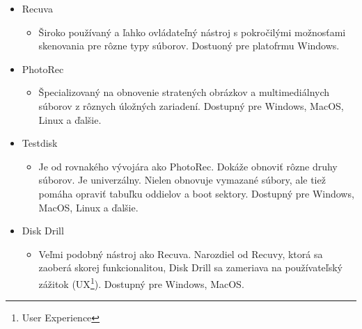\documentclass[12pt,oneside,slovak,a4paper]{article}
\begin{document}
\begin{spacing}{1.0}
\begin{itemize}
	\item Recuva
		\begin{itemize}
			\item Široko používaný a ľahko ovládateľný nástroj s pokročilými možnosťami skenovania pre rôzne typy súborov. Dostuoný pre platofrmu Windows.
		\end{itemize}
	\item PhotoRec
		\begin{itemize}
			\item Špecializovaný na obnovenie stratených obrázkov a multimediálnych súborov z rôznych úložných zariadení. Dostupný pre Windows, MacOS, Linux a ďalšie.
		\end{itemize}
	\item Testdisk
		\begin{itemize}
			\item Je od rovnakého vývojára ako PhotoRec. Dokáže obnoviť rôzne druhy súborov. Je univerzálny. Nielen obnovuje vymazané súbory, ale tiež pomáha opraviť tabuľku oddielov a boot sektory. Dostupný pre Windows, MacOS, Linux a ďalšie.
		\end{itemize}
	\item Disk Drill
		\begin{itemize}
			\item Veľmi podobný nástroj ako Recuva. Narozdiel od Recuvy, ktorá sa zaoberá skorej funkcionalitou, Disk Drill sa zameriava na používateľský zážitok (UX\footnote{User Experience}). Dostupný pre Windows, MacOS.
		\end{itemize}
\end{itemize}
\end{spacing}
\end{document}
